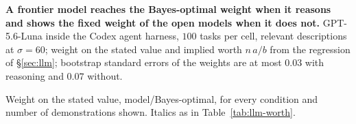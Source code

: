 \documentclass{article}
\begin{document}
\begin{table}[h]
\centering\small
\caption{\textbf{A frontier model reaches the Bayes-optimal weight when it reasons and shows the fixed weight of the open models when it does not.} GPT-5.6-Luna inside the Codex agent harness, $100$ tasks per cell, relevant descriptions at $\sigma = 60$; weight on the stated value and implied worth $n\,a/b$ from the regression of \S\ref{sec:llm}; bootstrap standard errors of the weights are at most $0.03$ with reasoning and $0.07$ without.}
\label{tab:agent}

\end{table}

\begin{table}[t]
\centering\scriptsize
\setlength{\tabcolsep}{2.5pt}
\caption{Weight on the stated value, model/Bayes-optimal, for every condition and number of demonstrations shown. Italics as in Table~\ref{tab:llm-worth}.}
\label{tab:llm-full}
\vspace{3pt}

\end{table}
\end{document}
